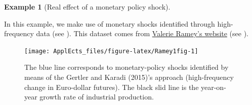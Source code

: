 \documentclass[
  12pt,
]{book}
\newenvironment{Shaded}{\begin{snugshade}}{\end{snugshade}}
\newcommand{\CommentTok}[1]{\textcolor[rgb]{0.56,0.35,0.01}{\textit{#1}}}
\newcommand{\ConstantTok}[1]{\textcolor[rgb]{0.00,0.00,0.00}{#1}}
\newcommand{\ControlFlowTok}[1]{\textcolor[rgb]{0.13,0.29,0.53}{\textbf{#1}}}
\newcommand{\DecValTok}[1]{\textcolor[rgb]{0.00,0.00,0.81}{#1}}
\newcommand{\FunctionTok}[1]{\textcolor[rgb]{0.00,0.00,0.00}{#1}}
\newcommand{\NormalTok}[1]{#1}
\newcommand{\OtherTok}[1]{\textcolor[rgb]{0.56,0.35,0.01}{#1}}
\newcommand{\SpecialCharTok}[1]{\textcolor[rgb]{0.00,0.00,0.00}{#1}}
\theoremstyle{definition}
\theoremstyle{definition}
\newtheorem{example}{Example}[chapter]
\theoremstyle{definition}
\theoremstyle{definition}
\theoremstyle{remark}
\begin{document}
\begin{example}[Real effect of a monetary policy shock]
\protect\hypertarget{exm:Ramey1}{}\label{exm:Ramey1}

In this example, we make use of monetary shocks identified through high-frequency data (see \citet{Gertler_Karadi_2015}). This dataset comes from \href{https://econweb.ucsd.edu/~vramey/research.html}{Valerie Ramey's website} (see \citet{Ramey_2016_NBER}).

\begin{Shaded}
\end{Shaded}

\begin{figure}
\texttt{[image: ApplEcts\_files/figure-latex/Ramey1fig-1]} \caption{The blue line corresponds to monetary-policy shocks identified by means of the Gertler and Karadi (2015)'s approach (high-frequency change in Euro-dollar futures). The black slid line is the year-on-year growth rate of industrial production.}\label{fig:Ramey1fig}
\end{figure}


\end{example}
\end{document}
